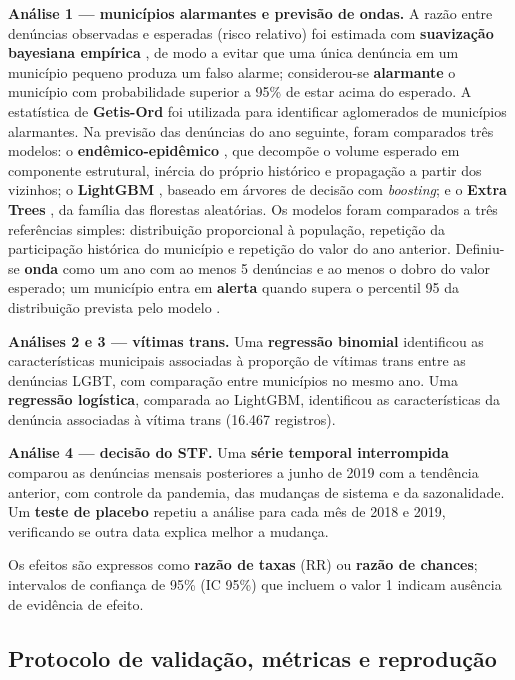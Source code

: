 \documentclass[12pt]{article}
\begin{document}
\textbf{Análise 1 --- municípios alarmantes e previsão de ondas.} A razão entre denúncias observadas e esperadas (risco relativo) foi estimada com \textbf{suavização bayesiana empírica} \cite{marshall:1991}, de modo a evitar que uma única denúncia em um município pequeno produza um falso alarme; considerou-se \textbf{alarmante} o município com probabilidade superior a 95\% de estar acima do esperado. A estatística de \textbf{Getis-Ord} \cite{getis_ord:1992} foi utilizada para identificar aglomerados de municípios alarmantes. Na previsão das denúncias do ano seguinte, foram comparados três modelos: o \textbf{endêmico-epidêmico} \cite{held_hohle_hofmann:2005}, que decompõe o volume esperado em componente estrutural, inércia do próprio histórico e propagação a partir dos vizinhos; o \textbf{LightGBM} \cite{ke:2017}, baseado em árvores de decisão com \textit{boosting}; e o \textbf{Extra Trees} \cite{geurts:2006}, da família das florestas aleatórias. Os modelos foram comparados a três referências simples: distribuição proporcional à população, repetição da participação histórica do município e repetição do valor do ano anterior. Definiu-se \textbf{onda} como um ano com ao menos 5 denúncias e ao menos o dobro do valor esperado; um município entra em \textbf{alerta} quando supera o percentil 95 da distribuição prevista pelo modelo \cite{farrington:1996}.

\textbf{Análises 2 e 3 --- vítimas trans.} Uma \textbf{regressão binomial} identificou as características municipais associadas à proporção de vítimas trans entre as denúncias LGBT, com comparação entre municípios no mesmo ano. Uma \textbf{regressão logística}, comparada ao LightGBM, identificou as características da denúncia associadas à vítima trans (16.467 registros).

\textbf{Análise 4 --- decisão do STF.} Uma \textbf{série temporal interrompida} \cite{bernal:2017} comparou as denúncias mensais posteriores a junho de 2019 com a tendência anterior, com controle da pandemia, das mudanças de sistema e da sazonalidade. Um \textbf{teste de placebo} repetiu a análise para cada mês de 2018 e 2019, verificando se outra data explica melhor a mudança.

Os efeitos são expressos como \textbf{razão de taxas} (RR) ou \textbf{razão de chances}; intervalos de confiança de 95\% (IC 95\%) que incluem o valor 1 indicam ausência de evidência de efeito.

\subsection{Protocolo de validação, métricas e reprodução}
\end{document}
